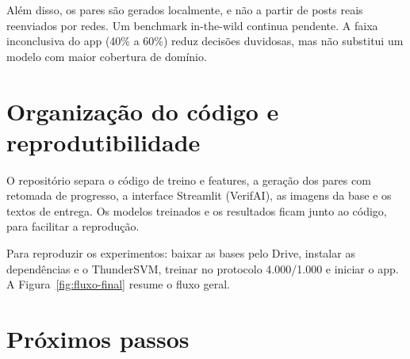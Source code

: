 \documentclass[12pt]{article}
\begin{document}
Além disso, os pares são gerados localmente, e não a partir de posts reais reenviados por redes. Um benchmark in-the-wild continua pendente. A faixa inconclusiva do app (40\% a 60\%) reduz decisões duvidosas, mas não substitui um modelo com maior cobertura de domínio.

\section{Organização do código e reprodutibilidade}

O repositório separa o código de treino e features, a geração dos pares com retomada de progresso, a interface Streamlit (VerifAI), as imagens da base e os textos de entrega. Os modelos treinados e os resultados ficam junto ao código, para facilitar a reprodução.

Para reproduzir os experimentos: baixar as bases pelo Drive, instalar as dependências e o ThunderSVM, treinar no protocolo 4{.}000/1{.}000 e iniciar o app. A Figura~\ref{fig:fluxo-final} resume o fluxo geral.

\begin{center}
\label{fig:fluxo-final}
\end{center}

\section{Próximos passos}
\label{sec:proximos}
\end{document}
